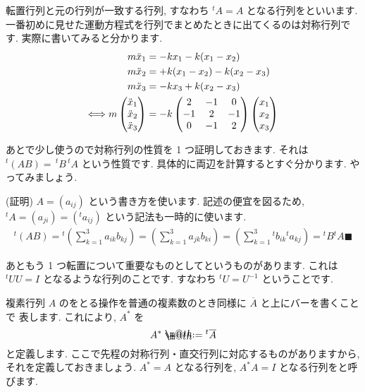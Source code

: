 \documentclass[openany, a4paper, oneside]{book}
\makeatletter
\newcommand*{\defeq}{\mathrel{\rlap{%
\raisebox{0.3ex}{$\m@th\cdot$}}%
\raisebox{-0.3ex}{$\m@th\cdot$}}%
=}
\theoremstyle{break}
\theoremstyle{breakdefn}
\makeatother
\begin{document}
転置行列と元の行列が一致する行列, すなわち $^{t} A = A$ となる行列をといいます.
一番初めに見せた運動方程式を行列でまとめたときに出てくるのは対称行列です. 実際に書いてみると分かります.
    \begin{align}
        m\ddot{x}_{1} &= -kx_1 - k (x_1 - x_2 ) \notag \\
        m\ddot{x}_{2} &= + k (x_1 - x_2 ) - k (x_2 - x_3) \notag \\
        m\ddot{x}_{3} &= -kx_3 +k (x_2 - x_3 )  \notag \\
        \Longleftrightarrow
        m \begin{pmatrix} \ddot{x}_{1} \\ \ddot{x}_{2} \\ \ddot{x}_{3} \end{pmatrix}
        &= -k \begin{pmatrix} 2 & -1 & 0 \\ -1 & 2 & -1 \\ 0 & -1 & 2 \end{pmatrix}
        \begin{pmatrix} x_{1} \\ x_{2} \\ x_{3} \end{pmatrix} \notag
    \end{align}

あとで少し使うので対称行列の性質を 1 つ証明しておきます. それは $^{t}(AB) =\, ^{t}B \, ^{t}A$ という性質です.
具体的に両辺を計算するとすぐ分かります. やってみましょう.

(証明) $A=(a_{ij})$ という書き方を使います.
記述の便宜を図るため,  $^{t}A = (a_{ji}) = (^{t}a_{ij})$ という記法も一時的に使います.
    \begin{align}
        {^t}(AB)
        = {^t} \left ( \sum_{k=1}^3 a_{ik}b_{kj} \right)
        = \left ( \sum_{k=1}^3 a_{jk}b_{ki} \right)
        = \left ( \sum_{k=1}^3 {^t}b_{ik} {^t}a_{kj} \right)
        = {^t}B {^t}A \blacksquare
    \end{align}

あともう 1 つ転置について重要なものとしてというものがあります.
これは $^{t}UU=I$ となるような行列のことです.
すなわち $^{t}U = U^{-1}$ ということです.


複素行列 $A$ のをとる操作を普通の複素数のとき同様に $\overline{A}$ と上にバーを書くことで
表します.
これにより,  $A^{*}$ を
    \begin{equation}
        A^{*} \defeq {^t}\overline{A}
    \end{equation}
と定義します. ここで先程の対称行列・直交行列に対応するものがありますから, それを定義しておきましょう.
 $A^{*}=A$ となる行列を,  $A^{*}A = I$ となる行列をと呼びます.
\end{document}
